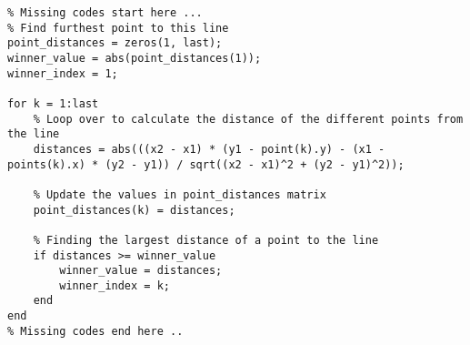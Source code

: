 \begin{lstlisting}
% Missing codes start here ...
% Find furthest point to this line 
point_distances = zeros(1, last);
winner_value = abs(point_distances(1));
winner_index = 1;

for k = 1:last
    % Loop over to calculate the distance of the different points from the line
    distances = abs(((x2 - x1) * (y1 - point(k).y) - (x1 - points(k).x) * (y2 - y1)) / sqrt((x2 - x1)^2 + (y2 - y1)^2));
    
    % Update the values in point_distances matrix
    point_distances(k) = distances;

    % Finding the largest distance of a point to the line
    if distances >= winner_value
        winner_value = distances;
        winner_index = k;
    end
end
% Missing codes end here ..
\end{lstlisting}
\label{fig:SLAMLidarMerge.}\\

